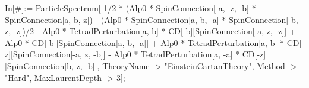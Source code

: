 In[\#]:= ParticleSpectrum[-1/2 * (Alp0 * SpinConnection[-a, -z, -b] * SpinConnection[a, b, z]) - (Alp0 * SpinConnection[a, b, -a] * SpinConnection[-b, z, -z])/2 - Alp0 * TetradPerturbation[a, b] * CD[-b][SpinConnection[-a, z, -z]] + Alp0 * CD[-b][SpinConnection[a, b, -a]] + Alp0 * TetradPerturbation[a, b] * CD[-z][SpinConnection[-a, z, -b]] - Alp0 * TetradPerturbation[a, -a] * CD[-z][SpinConnection[b, z, -b]], TheoryName -> "EinsteinCartanTheory", Method -> "Hard", MaxLaurentDepth -> 3]; 